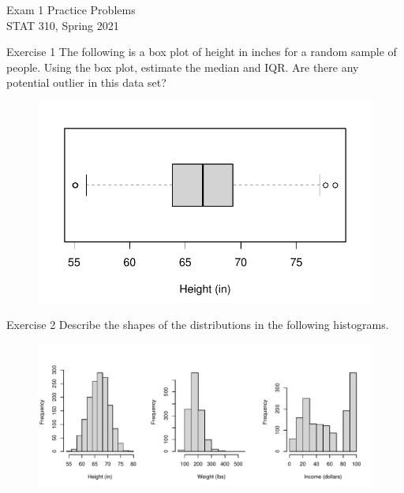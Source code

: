 \documentclass[10pt]{beamer}
\begin{document}
\begin{frame}
\large
Exam 1 Practice Problems\\
STAT 310, Spring 2021\\
\normalsize
\end{frame}

\begin{frame}{Exercise 1}
\vspace{-1cm}
The following is a box plot of height in inches for a random sample of people.  Using the box plot, estimate the median and IQR.  Are there any potential outlier in this data set?

\begin{figure}
\includegraphics[scale=0.55]{figure/boxplot_height.pdf}
\end{figure}
\end{frame}

\begin{frame}{Exercise 2}
Describe the shapes of the distributions in the following histograms.

\begin{figure}
\includegraphics[scale=0.55]{figure/hist3.pdf}
\end{figure}
\end{frame}
\end{document}
